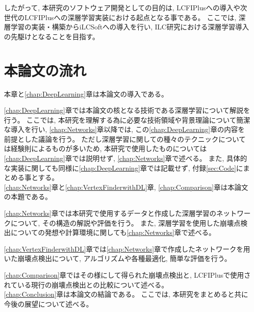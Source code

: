 したがって, 本研究のソフトウェア開発としての目的は, LCFIPlusへの導入や次世代のLCFIPlusへの深層学習実装における起点となる事である。
ここでは, 深層学習の実装・構築からiLCSoftへの導入を行い, ILC研究における深層学習導入の先駆けとなることを目指す。


\section{本論文の流れ} \label{Intro:Flow}

本章と\ref{chap:DeepLearning}章は本論文の導入である。

\ref{chap:DeepLearning}章では本論文の核となる技術である深層学習について解説を行う。
ここでは, 本研究を理解する為に必要な技術領域や背景理論について簡潔な導入を行い, \ref{chap:Networks}章以降では, この\ref{chap:DeepLearning}章の内容を前提とした議論を行う。
ただし深層学習に関しての種々のテクニックについては経験則によるものが多いため, 本研究で使用したものについては\ref{chap:DeepLearning}章では説明せず, \ref{chap:Networks}章で述べる。
また, 具体的な実装に関しても同様に\ref{chap:DeepLearning}章では記載せず, 付録\ref{sec:Code}にまとめる事とする。\\

\ref{chap:Networks}章と\ref{chap:VertexFinderwithDL}章, \ref{chap:Comparison}章は本論文の本題である。

\ref{chap:Networks}章では本研究で使用するデータと作成した深層学習のネットワークについて, その構造の解説や評価を行う。
また, 深層学習を使用した崩壊点検出についての発想や計算環境に関しても\ref{chap:Networks}章で述べる。

\ref{chap:VertexFinderwithDL}章では\ref{chap:Networks}章で作成したネットワークを用いた崩壊点検出について, アルゴリズムや各種最適化, 簡単な評価を行う。

\ref{chap:Comparison}章ではその様にして得られた崩壊点検出と, LCFIPlusで使用されている現行の崩壊点検出との比較について述べる。\\

\ref{chap:Conclusion}章は本論文の結論である。
ここでは, 本研究をまとめると共に今後の展望について述べる。

















